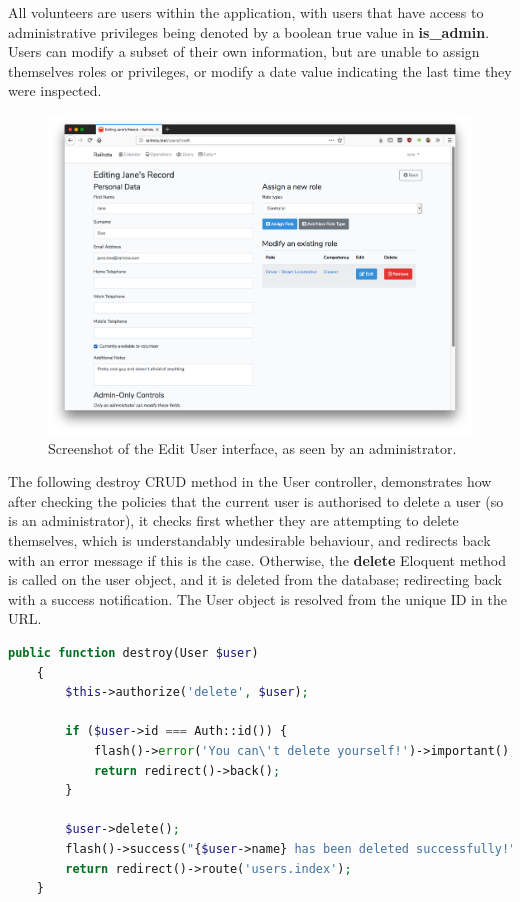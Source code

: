 All volunteers are users within the application, with users that have access to administrative privileges being denoted by a boolean true value in \textbf{is\_admin}. Users can modify a subset of their own information, but are unable to assign themselves roles or privileges, or modify a date value indicating the last time they were inspected.

\begin{figure}[!ht]
    \centering
    \includegraphics[width=1.0\textwidth]{Figures/screenshot-edit-user}
    \caption{Screenshot of the Edit User interface, as seen by an administrator.}
    \label{fig:users-edit}
\end{figure}

The following destroy CRUD method in the User controller, demonstrates how after checking the policies that the current user is authorised to delete a user (so is an administrator), it checks first whether they are attempting to delete themselves, which is understandably undesirable behaviour, and redirects back with an error message if this is the case. Otherwise, the \textbf{delete} Eloquent method is called on the user object, and it is deleted from the database; redirecting back with a success notification. The User object is resolved from the unique ID in the URL. \cite{Laravel7}

\begin{lstlisting}[language=PHP, breaklines]
    public function destroy(User $user)
    {
        $this->authorize('delete', $user);

        if ($user->id === Auth::id()) {
            flash()->error('You can\'t delete yourself!')->important();
            return redirect()->back();
        }

        $user->delete();
        flash()->success("{$user->name} has been deleted successfully!")->important();
        return redirect()->route('users.index');
    }
\end{lstlisting}

